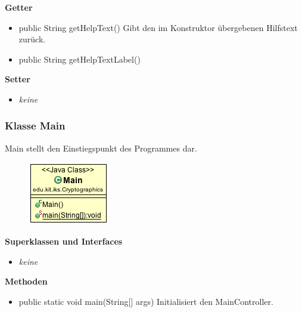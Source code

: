 \documentclass{article}
\begin{document}
      \textbf{Getter}
      \begin{itemize}
        \item public String getHelpText() \newline
        Gibt den im Konstruktor übergebenen Hilfstext zurück.
        \item public String getHelpTextLabel() \newline
      \end{itemize}

      \textbf{Setter}
      \begin{itemize}
        \item \textit{keine}
      \end{itemize}

    \subsubsection{Klasse Main}
      Main stellt den Einstiegspunkt des Programmes dar.
      \begin{figure}[H]
        \centering
        \includegraphics[width=\textwidth]{resources/edu-kit-iks-Cryptographics-Main}
      \end{figure}

      \textbf{Superklassen und Interfaces}
      \begin{itemize}
        \item \textit{keine}
      \end{itemize}
      
      \textbf{Methoden}
      \begin{itemize}
        \item public static void main(String[] args) \newline
        Initialisiert den MainController.
      \end{itemize}
\end{document}
